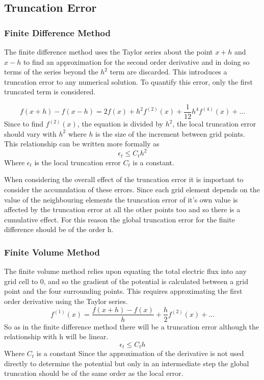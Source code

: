 \documentclass[aps,twocolumn,pre,nofootinbib,10pt]{revtex4-1}
\begin{document}
\subsection{Truncation Error}

\subsubsection{Finite Difference Method}

The finite difference method uses the Taylor series about the point \(x+h\) and \(x-h\) to find an approximation for the second order derivative and in doing so terms of the series beyond the \(h^2\) term are discarded. This introduces a truncation error to any numerical solution. To quantify this error, only the first truncated term is considered. 

\[f(x+h)-f(x-h) = 2f(x) + h^2f^{(2)}(x) + \frac{1}{12}h^4f^{(4)}(x) + \dots \]
Since to find \(f^{(2)}(x) \), the equation is divided by \(h^2\), the local truncation error should vary with \(h^2\) where \(h\) is the size of the increment between grid points. This relationship can be written more formally as
\[\epsilon_{t} \leq C_th^2 \]
Where \(\epsilon_{t}\) is the local truncation error \(C_t\) is a constant.

When considering the overall effect of the truncation error it is important to consider the accumulation of these errors. Since each grid element depends on the value of the neighbouring elements the truncation error of it's own value is affected by the truncation error at all the other points too and so there is a cumulative effect. For this reason the global truncation error for the finite difference should be of the order h\cite{parabol_fd}.


\subsubsection{Finite Volume Method}

The finite volume method relies upon equating the total electric flux into any grid cell to 0, and so the gradient of the potential is calculated between a grid point and the four surrounding points. This requires approximating the first order derivative using the Taylor series.
\[f^{(1)}(x) = \frac{f(x+h) - f(x)}{h} + \frac{h}{2}f^{(2)}(x) + \dots\]
So as in the finite difference method there will be a truncation error although the relationship with h will be linear.
\[\epsilon_t \leq C_th \]
Where \(C_t\) is a constant
Since the approximation of the derivative is not used directly to determine the potential but only in an intermediate step the global truncation should be of the same order as the local error.
\end{document}
